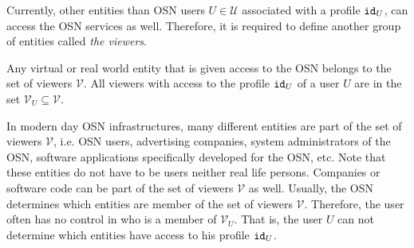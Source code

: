 Currently, other entities than OSN users $U \in \mathcal{U}$ associated with a profile $\mathtt{id}_{U}$, can access the OSN services as well. Therefore, it is required to define another group of entities called \textit{the viewers}.

\begin{defn}[Viewer]
\label{def:viewer}
 Any virtual or real world entity that is given access to the OSN belongs to the set of viewers $\mathcal{V}$. All viewers with access to the profile $\mathtt{id}_{U}$ of a user $U$ are in the set $\mathcal{V}_U \subseteq \mathcal{V}$.
\end{defn}

In modern day OSN infrastructures, many different entities are part of the set of viewers $\mathcal{V}$, i.e. OSN users, advertising companies, system administrators of the OSN, software applications specifically developed for the OSN, etc. Note that these entities do not have to be users neither real life persons. Companies or software code can be part of the set of viewers $\mathcal{V}$ as well. Usually, the OSN determines which entities are member of the set of viewers $\mathcal{V}$. Therefore, the user often has no control in who is a member of $\mathcal{V}_U$. That is, the user $U$ can not determine which entities have access to his profile $\mathtt{id}_{U}$.

